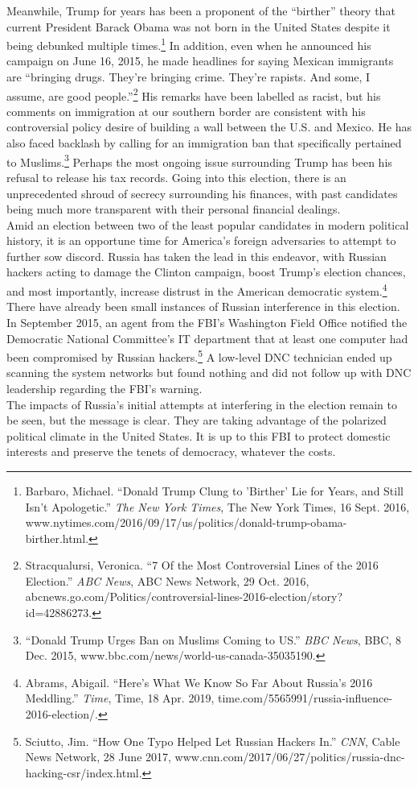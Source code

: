 \documentclass[10pt, letterpaper]{article}
\begin{document}
Meanwhile, Trump for years has been a proponent of the ``birther''
theory that current President Barack Obama was not born in the United
States despite it being debunked multiple times.\footnote{Barbaro,
  Michael. ``Donald Trump Clung to 'Birther' Lie for Years, and Still
  Isn't Apologetic.'' \emph{The New York Times}, The New York Times, 16
  Sept. 2016,
  www.nytimes.com/2016/09/17/us/politics/donald-trump-obama-birther.html.}
In addition, even when he announced his campaign on June 16, 2015, he
made headlines for saying Mexican immigrants are ``bringing drugs.
They're bringing crime. They're rapists. And some, I assume, are good
people.''\footnote{Stracqualursi, Veronica. ``7 Of the Most
  Controversial Lines of the 2016 Election.'' \emph{ABC News}, ABC News
  Network, 29 Oct. 2016,
  abcnews.go.com/Politics/controversial-lines-2016-election/story?id=42886273.}
His remarks have been labelled as racist, but his comments on
immigration at our southern border are consistent with his controversial
policy desire of building a wall between the U.S. and Mexico. He has
also faced backlash by calling for an immigration ban that specifically
pertained to Muslims.\footnote{``Donald Trump Urges Ban on Muslims
  Coming to US.'' \emph{BBC News}, BBC, 8 Dec. 2015,
  www.bbc.com/news/world-us-canada-35035190.} Perhaps the most ongoing
issue surrounding Trump has been his refusal to release his tax records.
Going into this election, there is an unprecedented shroud of secrecy
surrounding his finances, with past candidates being much more
transparent with their personal financial dealings. \\

Amid an election between two of the least popular candidates in modern
political history, it is an opportune time for America's foreign
adversaries to attempt to further sow discord. Russia has taken the lead
in this endeavor, with Russian hackers acting to damage the Clinton
campaign, boost Trump's election chances, and most importantly, increase
distrust in the American democratic system.\footnote{Abrams, Abigail.
  ``Here's What We Know So Far About Russia's 2016 Meddling.''
  \emph{Time}, Time, 18 Apr. 2019,
  time.com/5565991/russia-influence-2016-election/.} There have already
been small instances of Russian interference in this election. In
September 2015, an agent from the FBI's Washington Field Office notified
the Democratic National Committee's IT department that at least one
computer had been compromised by Russian hackers.\footnote{Sciutto, Jim.
  ``How One Typo Helped Let Russian Hackers In.'' \emph{CNN}, Cable News
  Network, 28 June 2017,
  www.cnn.com/2017/06/27/politics/russia-dnc-hacking-csr/index.html.} A
low-level DNC technician ended up scanning the system networks but found
nothing and did not follow up with DNC leadership regarding the FBI's
warning. \\
The impacts of Russia's initial attempts at interfering in the election
remain to be seen, but the message is clear. They are taking advantage
of the polarized political climate in the United States. It is up to
this FBI to protect domestic interests and preserve the tenets of
democracy, whatever the costs. \\
\end{document}
